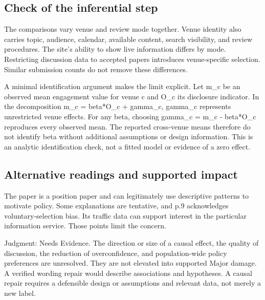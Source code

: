 \documentclass[10pt]{article}
\begin{document}
\subsection*{Check of the inferential step}
The comparisons vary venue and review mode together. Venue identity also carries topic, audience, calendar, available content, search visibility, and review procedures. The site’s ability to show live information differs by mode. Restricting discussion data to accepted papers introduces venue-specific selection. Similar submission counts do not remove these differences.\par
A minimal identification argument makes the limit explicit. Let m\_c be an observed mean engagement value for venue c and O\_c its disclosure indicator. In the decomposition m\_c = beta*O\_c + gamma\_c, gamma\_c represents unrestricted venue effects. For any beta, choosing gamma\_c = m\_c - beta*O\_c reproduces every observed mean. The reported cross-venue means therefore do not identify beta without additional assumptions or design information. This is an analytic identification check, not a fitted model or evidence of a zero effect.\par
\subsection*{Alternative readings and supported impact}
The paper is a position paper and can legitimately use descriptive patterns to motivate policy. Some explanations are tentative, and p.9 acknowledges voluntary-selection bias. Its traffic data can support interest in the particular information service. Those points limit the concern.\par
Judgment: Needs Evidence. The direction or size of a causal effect, the quality of discussion, the reduction of overconfidence, and population-wide policy preferences are unresolved. They are not elevated into supported Major damage. A verified wording repair would describe associations and hypotheses. A causal repair requires a defensible design or assumptions and relevant data, not merely a new label.\par
\end{document}
